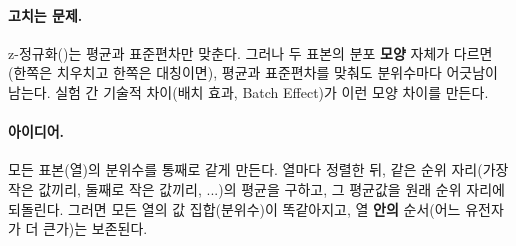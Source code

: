 \paragraph{고치는 문제.} z-정규화()는 평균과
표준편차만 맞춘다. 그러나 두 표본의 분포 \textbf{모양} 자체가 다르면
(한쪽은 치우치고 한쪽은 대칭이면), 평균과 표준편차를 맞춰도 분위수마다
어긋남이 남는다. 실험 간 기술적 차이(배치 효과, Batch Effect)가 이런
모양 차이를 만든다.

\paragraph{아이디어.} 모든 표본(열)의 분위수를 통째로 같게 만든다. 열마다
정렬한 뒤, 같은 순위 자리(가장 작은 값끼리, 둘째로 작은 값끼리, ...)의
평균을 구하고, 그 평균값을 원래 순위 자리에 되돌린다. 그러면 모든 열의
값 집합(분위수)이 똑같아지고, 열 \textbf{안의} 순서(어느 유전자가 더
큰가)는 보존된다.

